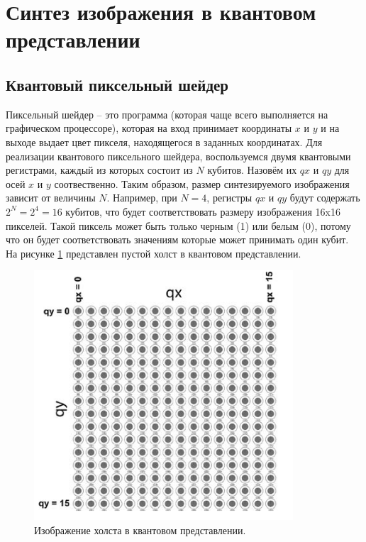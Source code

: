 \section{Синтез изображения в квантовом представлении}

\subsection{Квантовый пиксельный шейдер}

Пиксельный шейдер -- это программа (которая чаще всего выполняется на графическом процессоре), которая на вход принимает координаты $x$ и $y$ и на выходе выдает цвет пикселя, находящегося в заданных координатах. Для реализации квантового пиксельного шейдера, воспользуемся двумя квантовыми регистрами, каждый из которых состоит из $N$ кубитов. Назовём их $qx$ и $qy$ для осей $x$ и $y$ соотвественно. Таким образом, размер синтезируемого изображения зависит от величины $N$. Например, при $N = 4$, регистры $qx$ и $qy$ будут содержать $2^N = 2^4 = 16$ кубитов, что будет соответствовать размеру изображения 16x16 пикселей. Такой пиксель может быть только черным (1) или белым (0), потому что он будет соответствовать значениям которые может принимать один кубит. На рисунке \ref{img:holst} представлен пустой холст в квантовом представлении.

\begin{figure}[H]
	\begin{center}
		\includegraphics[scale=0.7]{img/holst.png}
	\end{center}
	\captionsetup{justification=centering}
	\caption{Изображение холста в квантовом представлении.}
	\label{img:holst}
\end{figure}

